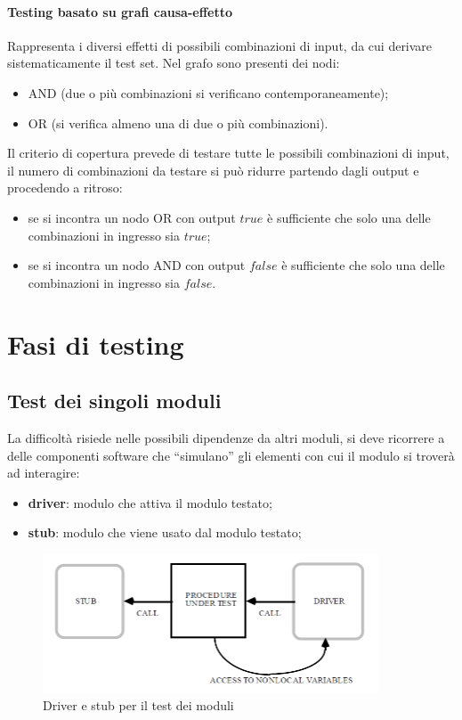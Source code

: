 \paragraph{Testing basato su grafi causa-effetto} Rappresenta i diversi effetti di possibili combinazioni di input, da cui derivare sistematicamente il test set. Nel grafo sono presenti dei nodi:
\begin{itemize}
    \item AND (due o più combinazioni si verificano contemporaneamente);
    \item OR (si verifica almeno una di due o più combinazioni).
\end{itemize}
Il criterio di copertura prevede di testare tutte le possibili combinazioni di input, il numero di combinazioni da testare si può ridurre partendo dagli output e procedendo a ritroso:
\begin{itemize}
    \item se si incontra un nodo OR con output $true$ è sufficiente che solo una delle combinazioni in ingresso sia $true$;
    \item se si incontra un nodo AND con output $false$ è sufficiente che solo una delle combinazioni in ingresso sia $false$.
\end{itemize}

\newpage

\section{Fasi di testing}

\subsection{Test dei singoli moduli}

La difficoltà risiede nelle possibili dipendenze da altri moduli, si deve ricorrere a delle componenti software che “simulano” gli elementi con cui il modulo si troverà ad interagire:
\begin{itemize}
    \item \textbf{driver}: modulo che attiva il modulo testato; 
    \item \textbf{stub}: modulo che viene usato dal modulo testato;
\end{itemize}

\begin{figure}[H]
    \centering
    \includegraphics[width=0.75\linewidth]{assets/driver-stub.png}
    \caption{Driver e stub per il test dei moduli}
    \label{fig:driver-stub}
\end{figure}

